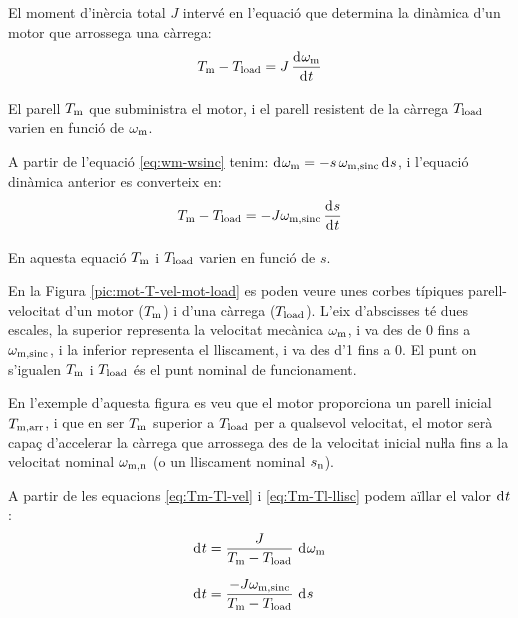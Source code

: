 El moment d'inèrcia total $J$ intervé en l'equació que  determina la dinàmica d'un motor que arrossega una càrrega:
\begin{equation}\label{eq:Tm-Tl-vel}
    T\ped{m} - T\ped{load} = J\,\frac{\diff \omega\ped{m}}{\diff t}
\end{equation}

El parell $T_\mathrm{m}$ que subministra el motor, i el parell resistent de la càrrega $T_\mathrm{load}$ varien en funció de $\omega_\mathrm{m}$.

A partir de l'equació \eqref{eq:wm-wsinc} tenim: $\diff \omega\ped{m} = -s\,\omega\ped{m,sinc} \diff s$, i l'equació dinàmica anterior es converteix en:
\begin{equation}\label{eq:Tm-Tl-llisc}
    T\ped{m} - T\ped{load} = -J \omega\ped{m,sinc}\,\frac{\diff s}{\diff t}
\end{equation}

En aquesta equació $T_\mathrm{m}$ i $T_\mathrm{load}$ varien en funció de $s$.


En la Figura \vref{pic:mot-T-vel-mot-load} es poden veure unes corbes típiques parell-velocitat d'un motor ($T_\mathrm{m}$) i d'una  càrrega ($T_\mathrm{load}$). L'eix d'abscisses té dues escales, la superior representa la velocitat mecànica $\omega_\mathrm{m}$, i va des de 0 fins a $\omega_\mathrm{m,sinc}$, i la inferior representa el lliscament, i va des d'1 fins a 0. El punt on s'igualen $T_\mathrm{m}$ i $T_\mathrm{load}$ és el punt nominal de funcionament.

En l'exemple d'aquesta figura es veu que el motor proporciona un parell inicial $T_\mathrm{m,arr}$, i que en ser $T_\mathrm{m}$  superior a $T_\mathrm{load}$ per a qualsevol velocitat, el motor serà  capaç d'accelerar la càrrega que arrossega des de la velocitat inicial nuŀla fins a la velocitat nominal $\omega_\mathrm{m,n}$ (o un lliscament nominal $s_\mathrm{n}$).
\begin{center}
    
    \label{pic:mot-T-vel-mot-load}
\end{center}

A partir de les equacions \eqref{eq:Tm-Tl-vel} i \eqref{eq:Tm-Tl-llisc} podem aïllar el valor $\diff t$:
\begin{subequations}
\begin{align}
    \diff t &= \frac{J}{T\ped{m}-T\ped{load}}\,\diff\omega\ped{m}\\[1.5ex]
    \diff t &= \frac{-J \omega\ped{m,sinc}}{T\ped{m}-T\ped{load}}\,\diff s
\end{align}
\end{subequations}

